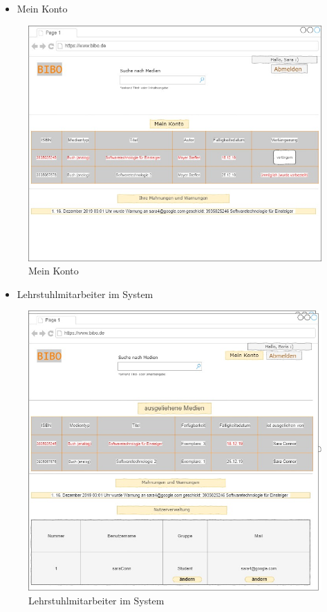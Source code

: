 \documentclass[12pt, a4paper]{article}
\begin{document}
\pagebreak
\begin{itemize}
	\item Mein Konto
\end{itemize}
\begin{figure}[h]
	\includegraphics[width=\textwidth]{GUIs/mein_Konto.jpg}
	\caption{Mein Konto}
	\label{fig:mein_konto}
\end{figure}
\pagebreak
\begin{itemize}
	\item Lehrstuhlmitarbeiter im System
\end{itemize}
\begin{figure}[h]
	\includegraphics[width=\textwidth]{GUIs/ang_ansicht.jpg}
	\caption{Lehrstuhlmitarbeiter im System}
	\label{fig:ang_ansicht}
\end{figure}
\pagebreak
\end{document}
